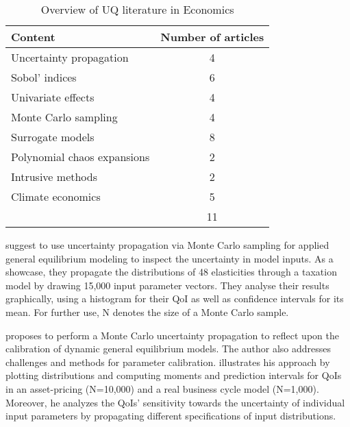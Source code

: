 \documentclass[a4paper,12pt]{article}
\begin{document}
\begin{table}[H]
	\centering
	\caption{Overview of UQ literature in Economics}
	\label{tab:my-table}
	\renewcommand{\arraystretch}{1.2}%
	\begin{tabular}{lc}
		\toprule
		Content                     & \multicolumn{1}{l}{Number of articles} \\ \midrule
		\rowcolor[gray]{.9} Uncertainty propagation     & 4                                    \\
		Sobol' indices              & 6                                    \\
		\rowcolor[gray]{.9} Univariate effects          & 4                                    \\
		Monte Carlo sampling                & 4                                    \\
		\rowcolor[gray]{.9} Surrogate models             & 8                                    \\
		Polynomial chaos expansions & 2                                    \\
		\rowcolor[gray]{.9} Intrusive methods            & 2                                    \\
		Climate economics           &
		5                                    \\
		\midrule
		& 11                                   \\
		\bottomrule
	\end{tabular}
\end{table}

\cite{Harrison.1992} suggest to use uncertainty propagation via Monte Carlo sampling for applied general equilibrium modeling to inspect the uncertainty in model inputs. As a showcase, they propagate the distributions of 48 elasticities through a taxation model by drawing 15,000 input parameter vectors. They analyse their results graphically, using a histogram for their QoI as well as confidence intervals for its mean. For further use, N denotes the size of a Monte Carlo sample.

\cite{Canova.1994} proposes to perform a Monte Carlo uncertainty propagation to reflect upon the calibration of dynamic general equilibrium models. The author also addresses challenges and methods for parameter calibration. \citeauthor{Canova.1994} illustrates his approach by plotting distributions and computing moments and prediction intervals for QoIs in an asset-pricing (N=10,000) and a real business cycle model (N=1,000). Moreover, he analyzes the QoIs' sensitivity towards the uncertainty of individual input parameters by propagating different specifications of input distributions.
\end{document}
